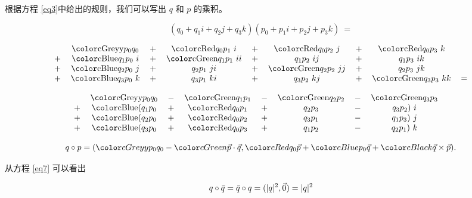 根据方程 \eqref{eq3}中给出的规则，我们可以写出 $q$ 和 $p$ 的乘积。 


\begin{equation*}
(q_0 + q_1i +q_2j +q_3k) (p_0 + p_1i +p_2j +p_3k) \ =
\label{eq4}
\end{equation*}

\begin{equation*}
\begin{tabular}{ccccccccc}
    & \Greyy{$p_0 q_0$}    &$+$&   \Red{$q_0 p_1 \ i$}   &$+$&   \Red{$q_0 p_2 \ j$}   &$+$&   \Red{$q_0 p_3 \ k$}  & \\
$+$ & \Blue{$q_1 p_0 \ i$} &$+$&   \Green{$q_1 p_1 \ ii$}  &$+$&   $q_1 p_2 \ ij$  &$+$&   $q_1 p_3 \ ik$ & \\
$+$ & \Blue{$q_2 p_0 \ j$} &$+$&   $q_2 p_1 \ ji$  &$+$&   \Green{$q_2 p_2 \ jj$}  &$+$&   $q_2 p_3 \ jk$ & \\
$+$ & \Blue{$q_3 p_0 \ k$} &$+$&   $q_3 p_1 \ ki$  &$+$&   $q_3 p_2 \ kj$  &$+$&   \Green{$q_3 p_3 \ kk$} & $=$ \\
\end{tabular}
\label{eq5}
\end{equation*}




\begin{equation*}
\begin{tabular}{ccccccccc}
    & \Greyy{$p_0 q_0$}   &$-$&   \Green{$q_1 p_1$}   &$-$&   \Green{$q_2 p_2$}    &$-$&   \Green{$q_3 p_3$}   & \\
$+$ & \Blue{$(q_1 p_0$}   &$+$&   \Red{$q_0 p_1$}   &$+$&   $q_2 p_3$    &$-$&   $q_3 p_2)\ i$   & \\
$+$ & \Blue{$(q_2 p_0$}   &$+$&   \Red{$q_0 p_2$}   &$+$&   $q_3 p_1$    &$-$&   $q_1 p_3)\ j$   & \\
$+$ & \Blue{$(q_3 p_0$}   &$+$&   \Red{$q_0 p_3$}   &$+$&   $q_1 p_2$    &$-$&   $q_2 p_1)\ k$   & \\
\end{tabular}
\label{eq6}
\end{equation*}

\begin{equation}
q \circ p = (\Greyy{p_0 q_0} - \Green{\v{p}\cdot\v{q}} , \Red{q_0 \v{p}} + \Blue{p_0 \v{q}} + \Black{\v{q}\c\v{p}}).
\label{eq7}
\end{equation}

从方程 \eqref{eq7} 可以看出

\begin{equation}
q \circ \bar{q} = \bar{q} \circ q = (|q|^2, \vec{0}) = |q|^2
\label{eqConj}
\end{equation}


